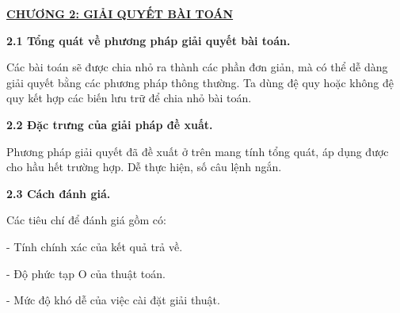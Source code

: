 \newpage
\changefontsizes{16pt}
\centerline{\textbf{\hyperlink{page.6}{CHƯƠNG 2: GIẢI QUYẾT BÀI TOÁN}}}



\bigskip
\changefontsizes{14pt}

\setlength{\parindent}{0.0cm}
\textbf{2.1 Tổng quát về phương pháp giải quyết bài toán.}

\smallskip
\changefontsizes{13pt}
\setlength{\parindent}{1.0cm}

Các bài toán sẽ được chia nhỏ ra thành các phần đơn giản, mà có thể dễ dàng giải quyết bằng các phương pháp thông thường. Ta dùng đệ quy hoặc không đệ quy kết hợp các biến lưu trữ để chia nhỏ bài toán.


\bigskip
\changefontsizes{14pt}

\setlength{\parindent}{0.0cm}
\textbf{2.2 Đặc trưng của giải pháp đề xuất.}


\smallskip
\changefontsizes{13pt}
\setlength{\parindent}{1.0cm}

Phương pháp giải quyết đã đề xuất ở trên mang tính tổng quát, áp dụng được cho hầu hết trường hợp. Dễ thực hiện, số câu lệnh ngắn.

\bigskip
\changefontsizes{14pt}

\setlength{\parindent}{0.0cm}
\textbf{2.3 Cách đánh giá.}

\smallskip
\changefontsizes{13pt}
\setlength{\parindent}{1cm}
Các tiêu chí để đánh giá gồm có:

- Tính chính xác của kết quả trả về.

- Độ phức tạp O của thuật toán.

- Mức độ khó dễ của việc cài đặt giải thuật.
